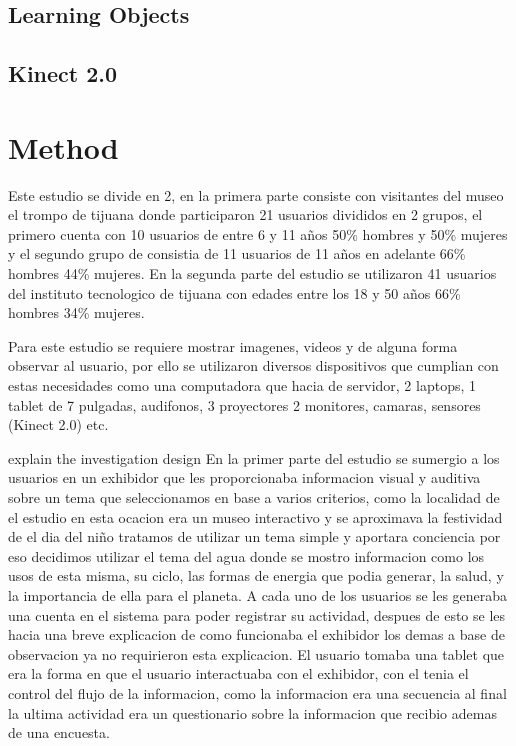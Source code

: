 \documentclass[journal]{IEEEtran}
\begin{document}
\subsection {Learning Objects}


\subsection {Kinect 2.0}

\section {Method}
\setlength{\parskip}{10pt}

Este estudio se divide en 2, en la primera parte consiste con visitantes del museo el trompo de tijuana donde participaron 21 usuarios divididos en 2 grupos, el primero cuenta con 10 usuarios de entre 6 y 11 años 50\% hombres y 50\% mujeres y el segundo grupo de consistia de 11 usuarios de 11 años en adelante 66\% hombres 44\% mujeres. En la segunda parte del estudio se utilizaron 41 usuarios del instituto tecnologico de tijuana con edades entre los 18 y 50 años 66\% hombres 34\% mujeres.

Para este estudio se requiere mostrar imagenes, videos y de alguna forma observar al usuario, por ello se utilizaron diversos dispositivos que cumplian con estas necesidades como una computadora que hacia de servidor, 2 laptops, 1 tablet de 7 pulgadas, audifonos, 3 proyectores 2 monitores, camaras, sensores (Kinect 2.0) etc.
    
explain the investigation design
En la primer parte del estudio se sumergio a los usuarios en un exhibidor que les proporcionaba informacion visual y auditiva sobre un tema que seleccionamos en base a varios criterios, como la localidad de el estudio en esta ocacion era un museo interactivo y se aproximava la festividad de el dia del niño tratamos de utilizar un tema simple y aportara conciencia por eso decidimos utilizar el tema del agua donde se mostro informacion como los usos de esta misma, su ciclo, las formas de energia que podia generar, la salud, y la importancia de ella para el planeta. A cada uno de los usuarios se les generaba una cuenta en el sistema para poder registrar su actividad, despues de esto se les hacia una breve explicacion de como funcionaba el exhibidor los demas a base de observacion ya no requirieron esta explicacion. El usuario tomaba una tablet que era la forma en que el usuario interactuaba con el exhibidor, con el tenia el control del flujo de la informacion, como la informacion era una secuencia al final la ultima actividad era un questionario sobre la informacion que recibio ademas de una encuesta.
\end{document}
